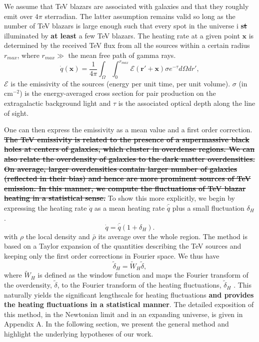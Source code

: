 \documentclass[twocolumns]{emulateapj}
\newcommand\ALc[1]{{\color{red} \bf #1}} %
\begin{document}
We assume that TeV blazars are associated with galaxies and that they roughly emit over $4\pi$ sterradian.  The latter assumption remains valid so long as the number of TeV blazars is large enough such that every spot in the universe i\ALc{s\sout{t}} illuminated by \ALc{at least} a few TeV blazars. 
The heating rate at a given point $\mathbf{x}$ is determined by the received TeV flux from all the sources within a certain radius $r_{max}$, where $r_{max} \gg $ the mean free path of gamma rays. %
\begin{equation}
\label{eq:heating_rate}
  \dot{q}(\mathbf{x})= \frac{1}{4\pi}  \int_{\Omega}\int_0^{r_{max}}   \mathcal{E}(\mathbf{r}'+\mathbf{x})\sigma  e^{-\tau}d\Omega dr' ,
\end{equation}
$\mathcal{E}$ is the emissivity of the sources (energy per unit time, per unit volume). $\sigma$ (in cm$^{-2}$) is the energy-averaged cross section for pair production on the extragalactic background light and $\tau$ is the associated optical depth along the line of sight. %

One can then express the emissivity as a mean value and a first order correction. \ALc{\sout{The TeV emissivity is related to the presence of a supermassive black holes at centers of galaxies, which cluster in overdense regions. We can also relate the overdensity of galaxies to the dark matter overdensities.  On average, larger overdensities contain larger number of galaxies (reflected in their bias) and hence are more prominent sources of TeV emission. In this manner, we compute the fluctuations of TeV blazar heating in a statistical sense.}}
To show this more explicitly, we begin by expressing the heating rate $\dot{q}$ as a mean heating rate $\bar{\dot{q}}$ plus a small fluctuation $\delta_H$.
\begin{equation}
  \label{eq:delta_h}
  \dot{q}=\bar{\dot{q}}(1+\delta_H).
\end{equation}
with $\rho$ the local density and $\bar{\rho}$ its average over the whole region. The method is based on a Taylor expansion of the quantities describing the TeV sources and keeping only the first order corrections in Fourier space.  We thus have
\begin{equation}
  \label{eq:use_window}
  \tilde{\delta}_H=\tilde{W}_H\tilde{\delta},
\end{equation}
where $\tilde{W}_H$ is defined as the window function and maps the Fourier transform of the overdensity, $\tilde{\delta}$, to the Fourier transform of the heating fluctuations, $\tilde{\delta}_H$ . This naturally yields the significant lengthscale for heating fluctuations \ALc{ and provides the heating fluctuations in a statistical manner}.
The detailed exposition of this method, in the Newtonian limit and in an expanding universe, is given in Appendix A. In the following section, we present the general method and highlight the underlying hypotheses of our work.
\end{document}
